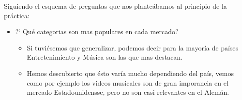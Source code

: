 \documentclass[a4paper,12pt]{article}
\begin{document}
Siguiendo el esquema de preguntas que nos plante\'abamos al principio de la pr\'actica:
\begin{itemize}

\item  ?` Qu\'e categorias son mas populares en cada mercado?
\begin{itemize}
\item Si tuvi\'esemos que generalizar, podemos decir para la mayor\'ia de pa\'ises Entretenimiento y M\'usica son las que mas destacan.
\item Hemos descubierto que \'esto var\'ia mucho dependiendo del pa\'is, vemos como por ejemplo los videos musicales son de gran imporancia en el mercado Estadounidensse, pero no son casi relevantes en el Alem\'an. 
\end{itemize}


\end{itemize}
\end{document}
